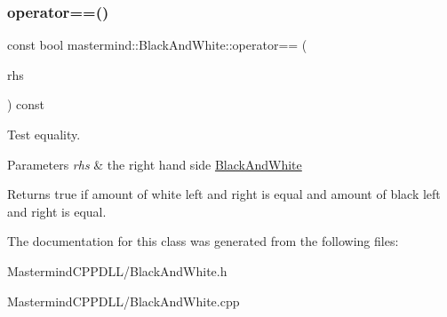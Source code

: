 \subsubsection{\texorpdfstring{operator==()}{operator==()}\hspace{0.1cm}{\footnotesize\ttfamily [2/2]}}
{\footnotesize\ttfamily const bool mastermind\+::\+Black\+And\+White\+::operator== (\begin{DoxyParamCaption}\item[{const \hyperlink{classmastermind_1_1_black_and_white}{Black\+And\+White} \&}]{rhs }\end{DoxyParamCaption}) const}



Test equality. 


\begin{DoxyParams}{Parameters}
{\em rhs} & the right hand side \hyperlink{classmastermind_1_1_black_and_white}{Black\+And\+White} \\
\hline
\end{DoxyParams}
\begin{DoxyReturn}{Returns}
{\ttfamily true} if amount of white left and right is equal and amount of black left and right is equal. 
\end{DoxyReturn}


The documentation for this class was generated from the following files\+:\begin{DoxyCompactItemize}
\item 
Mastermind\+C\+P\+P\+D\+L\+L/Black\+And\+White.\+h\item 
Mastermind\+C\+P\+P\+D\+L\+L/Black\+And\+White.\+cpp\end{DoxyCompactItemize}
